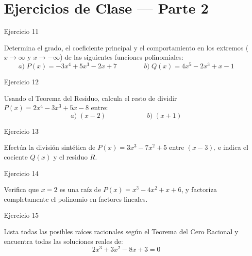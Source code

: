 \documentclass[aspectratio=169]{beamer}
\begin{document}
\section{Ejercicios de Clase — Parte 2}

\begin{frame}{Ejercicio 11}
  \begin{mwejercicio}
    Determina el grado, el coeficiente principal y el comportamiento en los extremos ($x \to \infty$ y $x \to -\infty$) de las siguientes funciones polinomiales:
    $$a)\; P(x) = -3x^4 + 5x^3 - 2x + 7 \qquad\qquad b)\; Q(x) = 4x^5 - 2x^3 + x - 1$$
  \end{mwejercicio}
  \vspace{3.5cm}
\end{frame}
\begin{frame}{Ejercicio 12}
  \begin{mwejercicio}
    Usando el Teorema del Residuo, calcula el resto de dividir $P(x) = 2x^4 - 3x^3 + 5x - 8$ entre:
    $$a)\; (x - 2) \qquad\qquad\qquad b)\; (x + 1)$$
  \end{mwejercicio}
  \vspace{3.5cm}
\end{frame}
\begin{frame}{Ejercicio 13}
  \begin{mwejercicio}
    Efectúa la división sintética de $P(x) = 3x^3 - 7x^2 + 5$ entre $(x - 3)$, e indica el cociente $Q(x)$ y el residuo $R$.
  \end{mwejercicio}
  \vspace{3.5cm}
\end{frame}
\begin{frame}{Ejercicio 14}
  \begin{mwejercicio}
    Verifica que $x = 2$ es una raíz de $P(x) = x^3 - 4x^2 + x + 6$, y factoriza completamente el polinomio en factores lineales.
  \end{mwejercicio}
  \vspace{3.5cm}
\end{frame}
\begin{frame}{Ejercicio 15}
  \begin{mwejercicio}
    Lista todas las posibles raíces racionales según el Teorema del Cero Racional y encuentra todas las soluciones reales de:
    $$2x^3 + 3x^2 - 8x + 3 = 0$$
  \end{mwejercicio}
  \vspace{3.5cm}
\end{frame}
\end{document}

